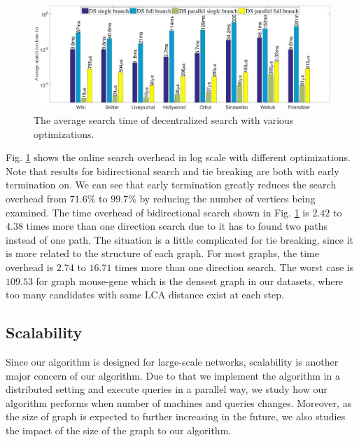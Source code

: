 \begin{figure}[t]
    \centering
    \includegraphics[width=\linewidth]{../figures/overhead_search.pdf}
    \caption{The average search time of decentralized search with various optimizations.}
    \label{fig:overhead_search}
\end{figure}

Fig. \ref{fig:overhead_search} shows the online search overhead in log scale with different optimizations. Note that results for bidirectional search and tie breaking are both with early termination on. We can see that early termination greatly reduces the search overhead from $71.6\%$ to $99.7\%$ by reducing the number of vertices being examined. The time overhead of bidirectional search shown in Fig. \ref{fig:overhead_search} is $2.42$ to $4.38$ times more than one direction search due to it has to found two paths instead of one path. The situation is a little complicated for tie breaking, since it is more related to the structure of each graph. For most graphs, the time overhead is $2.74$ to $16.71$ times more than one direction search. The worst case is $109.53$ for graph mouse-gene which is the densest graph in our datasets, where too many candidates with same LCA distance exist at each step.

\subsection{Scalability}
\label{eval_scalability}

Since our algorithm is designed for large-scale networks, scalability is another major concern of our algorithm. Due to that we implement the algorithm in a distributed setting and execute queries in a parallel way, we study how our algorithm performs when number of machines and queries changes. Moreover, as the size of graph is expected to further increasing in the future, we also studies the impact of the size of the graph to our algorithm.

